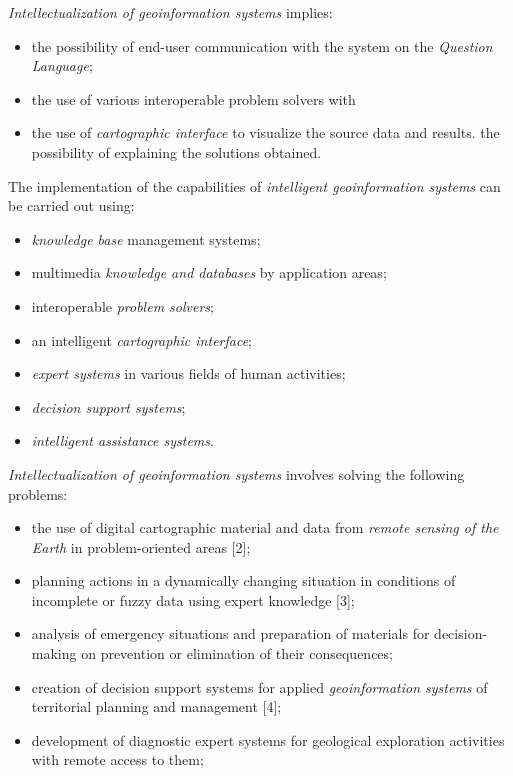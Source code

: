\documentclass{article}
\begin{document}
\begin{multicols}{2}
\textit{Intellectualization of geoinformation systems} implies:
\begin{itemize}
    \item the possibility of end-user communication with the
system on the \textit{Question Language};
    \item the use of various interoperable problem solvers with
    \item the use of \textit{cartographic interface} to visualize the
source data and results.
the possibility of explaining the solutions obtained.
\end{itemize}
\par
The implementation of the capabilities of \textit{intelligent geoinformation systems} can be carried out using:
\begin{itemize}
    \item \textit{knowledge base} management systems;
    \item multimedia \textit{knowledge and databases} by application areas;
    \item interoperable \textit{problem solvers};
    \item an intelligent \textit{cartographic interface};
    \item \textit{expert systems} in various fields of human activities;
    \item \textit{decision support systems};
    \item \textit{intelligent assistance systems}.
\end{itemize}
\par
\textit{Intellectualization of geoinformation systems} involves solving the following problems:
\begin{itemize}
    \item the use of digital cartographic material and data from \textit{remote sensing of the Earth} in problem-oriented areas [2];
    \item planning actions in a dynamically changing situation in conditions of incomplete or fuzzy data using expert knowledge [3];
    \item analysis of emergency situations and preparation of materials for decision-making on prevention or elimination of their consequences;
    \item creation of decision support systems for applied
\textit{geoinformation systems} of territorial planning and
management [4];
    \item development of diagnostic expert systems for geological exploration activities with remote access to them;

\end{itemize}
\end{multicols}
\end{document}
